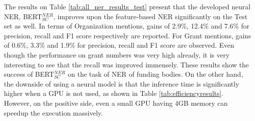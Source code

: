 \documentclass{report}
\theoremstyle{definition}
\theoremstyle{remark}
\begin{document}
The results on Table \ref{tab:all_ner_results_test} present that the developed neural NER, BERT$_{SC}^{NER}$, improves upon the feature-based NER significantly on the Test set as well. In terms of Organization mentions, gains of 2.9\%, 12.4\% and 7.6\% for precision, recall and F1 score respectively are reported. For Grant mentions, gains of 0.6\%, 3.3\% and 1.9\% for precision, recall and F1 score are observed. Even though the performance on grant numbers was very high already, it is very interesting to see that the recall was improved immensely. These results show the success of BERT$^{NER}_{SC}$ on the task of NER of funding bodies. On the other hand, the downside of using a neural model is that the inference time is significantly higher when a GPU is not used, as shown in Table \ref{tab:efficiencyresults}. However, on the positive side, even a small GPU having 4GB memory can speedup the execution massively.
\end{document}
